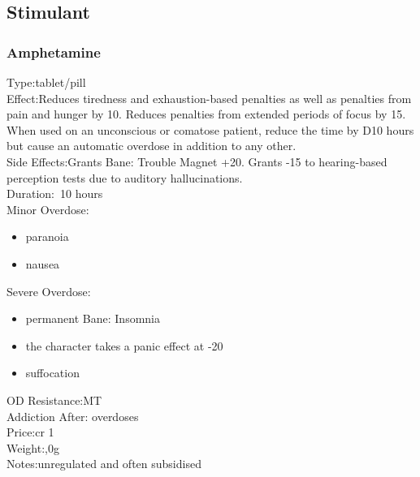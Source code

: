 \subsection{Stimulant}
\subsubsection{Amphetamine}
Type:\tab tablet/pill\\
Effect:\tab Reduces tiredness and exhaustion-based penalties as well as penalties from pain and hunger by 10. Reduces penalties from extended periods of focus by 15.
When used on an unconscious or comatose patient, reduce the time by D10 hours but cause an automatic overdose in addition to any other.\\
Side Effects:\tab Grants Bane: Trouble Magnet +20. Grants -15 to hearing-based perception tests due to auditory hallucinations.\\
Duration:\tab ~10 hours\\
Minor Overdose:\\
\begin{itemize}
	\setlength\itemsep{-8mm}
	\vspace{-12mm}
	\item paranoia
	\item nausea
\end{itemize}
Severe Overdose:\\
\begin{itemize}
	\setlength\itemsep{-8mm}
	\vspace{-12mm}
	\item permanent Bane: Insomnia
	\item the character takes a panic effect at -20
	\item suffocation
\end{itemize}
OD Resistance:\tab MT\\
Addiction After: overdoses\\
Price:\tab cr 1\\
Weight:,0g\\
Notes:\tab unregulated and often subsidised


